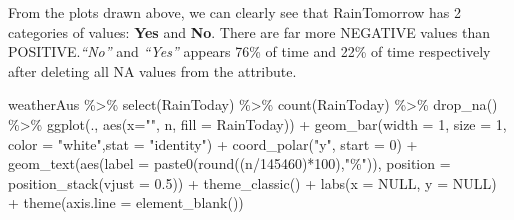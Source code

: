 \documentclass[
  letterpaper,
  DIV=11,
  numbers=noendperiod]{scrartcl}
\newenvironment{Shaded}{\begin{snugshade}}{\end{snugshade}}
\newcommand{\AttributeTok}[1]{\textcolor[rgb]{0.40,0.45,0.13}{#1}}
\newcommand{\ConstantTok}[1]{\textcolor[rgb]{0.56,0.35,0.01}{#1}}
\newcommand{\DecValTok}[1]{\textcolor[rgb]{0.68,0.00,0.00}{#1}}
\newcommand{\FloatTok}[1]{\textcolor[rgb]{0.68,0.00,0.00}{#1}}
\newcommand{\FunctionTok}[1]{\textcolor[rgb]{0.28,0.35,0.67}{#1}}
\newcommand{\NormalTok}[1]{\textcolor[rgb]{0.00,0.23,0.31}{#1}}
\newcommand{\SpecialCharTok}[1]{\textcolor[rgb]{0.37,0.37,0.37}{#1}}
\newcommand{\StringTok}[1]{\textcolor[rgb]{0.13,0.47,0.30}{#1}}
\begin{document}
\hfill\break
From the plots drawn above, we can clearly see that RainTomorrow has 2
categories of values: \textbf{Yes} and \textbf{No}. There are far more
NEGATIVE values than POSITIVE.\emph{``No''} and \emph{``Yes''} appears
76\% of time and 22\% of time respectively after deleting all NA values
from the attribute.

\begin{Shaded}
\begin{Highlighting}[]
\NormalTok{  weatherAus }\SpecialCharTok{\%\textgreater{}\%} \FunctionTok{select}\NormalTok{(RainToday) }\SpecialCharTok{\%\textgreater{}\%}
  \FunctionTok{count}\NormalTok{(RainToday) }\SpecialCharTok{\%\textgreater{}\%} \FunctionTok{drop\_na}\NormalTok{() }\SpecialCharTok{\%\textgreater{}\%}
  \FunctionTok{ggplot}\NormalTok{(., }\FunctionTok{aes}\NormalTok{(}\AttributeTok{x=}\StringTok{""}\NormalTok{, n, }\AttributeTok{fill =}\NormalTok{ RainToday)) }\SpecialCharTok{+}
  \FunctionTok{geom\_bar}\NormalTok{(}\AttributeTok{width =} \DecValTok{1}\NormalTok{, }\AttributeTok{size =} \DecValTok{1}\NormalTok{, }\AttributeTok{color =} \StringTok{"white"}\NormalTok{,}\AttributeTok{stat =} \StringTok{"identity"}\NormalTok{) }\SpecialCharTok{+} \FunctionTok{coord\_polar}\NormalTok{(}\StringTok{"y"}\NormalTok{, }\AttributeTok{start =} \DecValTok{0}\NormalTok{) }\SpecialCharTok{+}
  \FunctionTok{geom\_text}\NormalTok{(}\FunctionTok{aes}\NormalTok{(}\AttributeTok{label =} \FunctionTok{paste0}\NormalTok{(}\FunctionTok{round}\NormalTok{((n}\SpecialCharTok{/}\DecValTok{145460}\NormalTok{)}\SpecialCharTok{*}\DecValTok{100}\NormalTok{),}\StringTok{"\%"}\NormalTok{)),}
            \AttributeTok{position =} \FunctionTok{position\_stack}\NormalTok{(}\AttributeTok{vjust =} \FloatTok{0.5}\NormalTok{)) }\SpecialCharTok{+}
  \FunctionTok{theme\_classic}\NormalTok{() }\SpecialCharTok{+}
  \FunctionTok{labs}\NormalTok{(}\AttributeTok{x =} \ConstantTok{NULL}\NormalTok{, }\AttributeTok{y =} \ConstantTok{NULL}\NormalTok{) }\SpecialCharTok{+}
  \FunctionTok{theme}\NormalTok{(}\AttributeTok{axis.line =} \FunctionTok{element\_blank}\NormalTok{())}
\end{Highlighting}
\end{Shaded}
\end{document}
